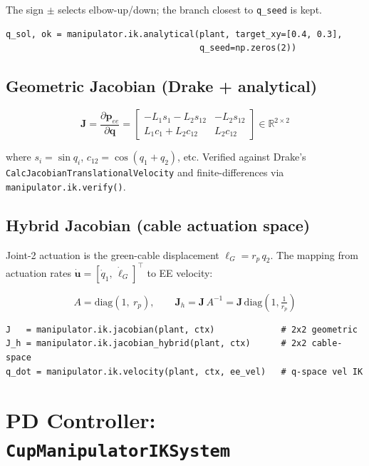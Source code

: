 \documentclass[11pt, a4paper]{article}
\newcommand{\bq}{\bm{q}}
\begin{document}
The sign $\pm$ selects elbow-up/down; the branch closest to \texttt{q\_seed}
is kept.

\begin{lstlisting}
q_sol, ok = manipulator.ik.analytical(plant, target_xy=[0.4, 0.3],
                                      q_seed=np.zeros(2))
\end{lstlisting}

\subsection{Geometric Jacobian (Drake + analytical)}

\begin{equation}
  \mathbf{J} = \frac{\partial \bm{p}_{ee}}{\partial \bq}
  = \begin{bmatrix}
    -L_1 s_1 - L_2 s_{12} & -L_2 s_{12} \\
     L_1 c_1 + L_2 c_{12} &  L_2 c_{12}
  \end{bmatrix} \in \mathbb{R}^{2 \times 2}
\end{equation}

where $s_i = \sin q_i$, $c_{12} = \cos(q_1+q_2)$, etc.
Verified against Drake's \texttt{CalcJacobianTranslationalVelocity} and
finite-differences via \texttt{manipulator.ik.verify()}.

\subsection{Hybrid Jacobian (cable actuation space)}

Joint-2 actuation is the green-cable displacement $\ell_G = r_p\,q_2$.
The mapping from actuation rates $\dot{\bm{u}} = [\dot{q}_1,\, \dot{\ell}_G]^\top$
to EE velocity:

\begin{equation}
  A = \mathrm{diag}(1,\ r_p), \qquad
  \mathbf{J}_h = \mathbf{J}\,A^{-1} = \mathbf{J}\,\mathrm{diag}\!\left(1,\tfrac{1}{r_p}\right)
\end{equation}

\begin{lstlisting}
J   = manipulator.ik.jacobian(plant, ctx)             # 2x2 geometric
J_h = manipulator.ik.jacobian_hybrid(plant, ctx)      # 2x2 cable-space
q_dot = manipulator.ik.velocity(plant, ctx, ee_vel)   # q-space vel IK
\end{lstlisting}

\section{PD Controller: \texttt{CupManipulatorIKSystem}}
\end{document}
